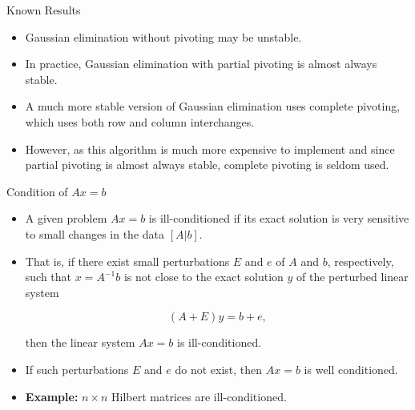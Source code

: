 \documentclass[12pt]{beamer}
\begin{document}
\begin{frame}{Known Results}

\begin{itemize}
\item{Gaussian elimination without pivoting may be unstable.}
\item{In practice, Gaussian elimination with partial pivoting is almost always stable.}
\item{A much more stable version of Gaussian elimination uses complete pivoting, which uses both row and column interchanges.}
\item{However, as this algorithm is much more expensive to implement and since partial pivoting is almost always stable, complete pivoting is seldom used.}
\end{itemize}
\end{frame}

\begin{frame}{Condition of $Ax=b$}

\begin{itemize}
\item{A given problem $Ax=b$ is ill-conditioned if its exact solution is very sensitive to small changes in the data $[A | b]$.}
\item{That is, if there exist small perturbations $E$ and $e$ of $A$ and $b$, respectively, such that $x=A^{-1}b$
 is not close to the exact solution $y$ of the perturbed linear system

\[ (A+E)y=b+e, \]

then the linear system $Ax=b$ is ill-conditioned.}
\item{If such perturbations $E$ and $e$ do not exist, then $Ax=b$ is well conditioned.}
\item{{\bf Example:} $n \times n$ Hilbert matrices are ill-conditioned.}
\end{itemize}
\end{frame}
\end{document}
